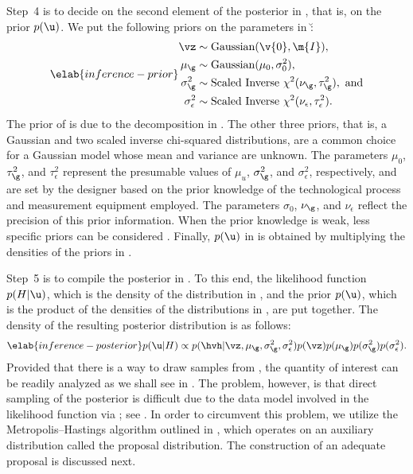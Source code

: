 Step~4 is to decide on the second element of the posterior in
, that is, on the prior $p(\u)$. We put the following priors
on the parameters in \u:
\begin{align} \elab{inference-prior}
  \begin{split}
    \vz               & \sim \mathrm{Gaussian}(\v{0}, \m{I}), \\
    \mu_\g            & \sim \mathrm{Gaussian}(\mu_0, \sigma^2_0), \\
    \sigma^2_\g       & \sim \mathrm{Scaled\ Inverse\ } \chi^2(\nu_\g, \tau^2_\g), \text{ and} \\
    \sigma^2_\epsilon & \sim \mathrm{Scaled\ Inverse\ } \chi^2(\nu_\epsilon, \tau^2_\epsilon).
  \end{split}
\end{align}
The prior of \vz is due to the decomposition in . The
other three priors, that is, a Gaussian and two scaled inverse chi-squared
distributions, are a common choice for a Gaussian model whose mean and variance
are unknown. The parameters $\mu_0$, $\tau^2_\g$, and $\tau^2_\epsilon$
represent the presumable values of $\mu_u$, $\sigma^2_\g$, and
$\sigma^2_\epsilon$, respectively, and are set by the designer based on the
prior knowledge of the technological process and measurement equipment employed.
The parameters $\sigma_0$, $\nu_\g$, and $\nu_\epsilon$ reflect the precision of
this prior information. When the prior knowledge is weak, less specific priors
can be considered \cite{gelman2013}. Finally, $p(\u)$ in  is
obtained by multiplying the densities of the priors in .

Step~5 is to compile the posterior in . To this end, the
likelihood function $p(H | \u)$, which is the density of the distribution in
, and the prior $p(\u)$, which is the product of the
densities of the distributions in , are put together. The
density of the resulting posterior distribution is as follows:
\begin{equation} \elab{inference-posterior}
  p(\u | H) \propto p(\hvh | \vz, \mu_\g, \sigma^2_\g, \sigma^2_\epsilon) p(\vz) p(\mu_\g) p(\sigma^2_\g) p(\sigma^2_\epsilon).
\end{equation}
Provided that there is a way to draw samples from ,
the quantity of interest \g can be readily analyzed as we shall see in
. The problem, however, is that direct sampling
of the posterior is difficult due to the data model involved in the likelihood
function via \vh; see . In order to circumvent this
problem, we utilize the Metropolis--Hastings algorithm \cite{gelman2013}
outlined in , which operates on an auxiliary
distribution called the proposal distribution. The construction of an adequate
proposal is discussed next.

